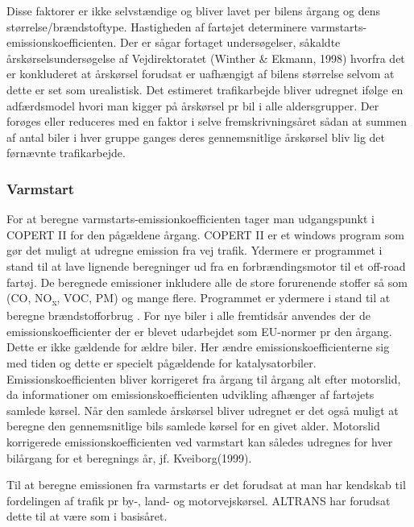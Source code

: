 \vspace{5mm}

Disse faktorer er ikke selvstændige og bliver lavet per bilens årgang og dens størrelse/brændstoftype. Hastigheden af fartøjet determinere varmstarts-emissionskoefficienten. Der er sågar fortaget undersøgelser, såkaldte årskørselsundersøgelse af Vejdirektoratet (Winther & Ekmann, 1998) hvorfra det er konkluderet at årskørsel forudsat er uafhængigt af bilens størrelse selvom at dette er set som urealistisk. Det estimeret trafikarbejde bliver udregnet ifølge en adfærdsmodel hvori man kigger på årskørsel pr bil i alle aldersgrupper. Der forøges eller reduceres med en faktor i selve fremskrivningsåret sådan at summen af antal biler i hver gruppe ganges deres gennemsnitlige årskørsel bliv lig det førnævnte trafikarbejde.

\subsubsection{Varmstart}
For at beregne varmstarts-emissionkoefficienten tager man udgangspunkt i COPERT II for den pågældene årgang. COPERT II er et windows program som gør det muligt at udregne emission fra vej trafik. Ydermere er programmet i stand til at lave lignende beregninger ud fra en forbrændingsmotor til et off-road fartøj. De beregnede emissioner inkludere alle de store forurenende stoffer så som (CO, NO\textsubscript{x}, VOC, PM) og mange flere. Programmet er ydermere i stand til at beregne brændstofforbrug \cite[s 4]{COPERT II}.  For nye biler i alle fremtidsår anvendes der de emissionskoefficienter der er blevet udarbejdet som EU-normer pr den årgang. Dette er ikke gældende for ældre biler. Her ændre emissionskoefficienterne sig med tiden og dette er specielt pågældende for katalysatorbiler. Emissionskoefficienten bliver korrigeret fra årgang til årgang alt efter motorslid, da informationer om emissionskoefficienten udvikling afhænger af fartøjets samlede kørsel. Når den samlede årskørsel bliver udregnet er det også muligt at beregne den gennemsnitlige bils samlede kørsel for en givet alder. Motorslid korrigerede emissionskoefficienten ved varmstart kan således udregnes for hver bilårgang for et beregnings år, jf. Kveiborg(1999).

\vspace{5mm}

Til at beregne emissionen fra varmstarts er det forudsat at man har kendskab til fordelingen af trafik pr by-, land- og motorvejskørsel. ALTRANS har forudsat dette til at være som i basisåret.
